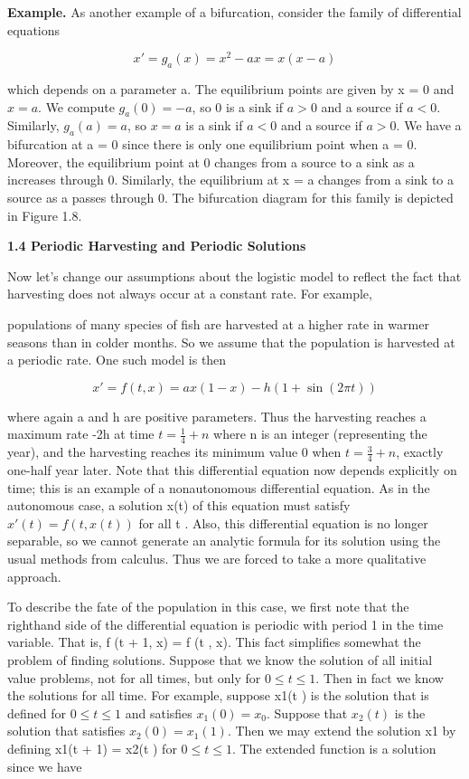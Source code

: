 \documentclass[12pt]{article}
\begin{document}
\hfill

\textbf{Example.} As another example of a bifurcation, consider the family of
differential equations

\[
x' = g_a(x) = x^2 - ax = x(x - a)
\]

which depends on a parameter a. The equilibrium points are given by x = 0
and $x = a$. We compute $g_a(0) = -a$, so 0 is a sink if $a > 0$ and a source if
$a < 0$. Similarly, $g_a(a) = a$, so $x = a$ is a sink if $a < 0$ and a source if $a > 0$.
We have a bifurcation at a = 0 since there is only one equilibrium point when
a = 0. 
Moreover, the equilibrium point at 0 changes from a source to a sink as a increases through 0. 
Similarly, the equilibrium at x = a changes from a sink to a source as a passes through 0.
The bifurcation diagram for this family is depicted in Figure 1.8.

\hfill

\textbf{1.4 Periodic Harvesting and
Periodic Solutions}

\hfill

Now let’s change our assumptions about the logistic model to reflect the
fact that harvesting does not always occur at a constant rate. For example,

populations of many species of fish are harvested at a higher rate in warmer
seasons than in colder months. So we assume that the population is harvested
at a periodic rate. One such model is then

\[
x' = f (t, x) = ax(1 - x) - h(1 + \sin (2 \pi t))
\]


where again a and h are positive parameters. Thus the harvesting reaches a
maximum rate -2h at time $t = \frac{1}{4}+ n$ where n is an integer (representing the
year), and the harvesting reaches its minimum value 0 when $t = \frac{3}{4}+n$, exactly
one-half year later. Note that this differential equation now depends explicitly
on time; this is an example of a nonautonomous differential equation. As in
the autonomous case, a solution x(t) of this equation must satisfy $x'(t) = f (t , x(t ))$ for all t . Also, this differential equation is no longer separable, so we
cannot generate an analytic formula for its solution using the usual methods
from calculus. Thus we are forced to take a more qualitative approach.

To describe the fate of the population in this case, we first note that the righthand
side of the differential equation is periodic with period 1 in the time
variable. That is, f (t + 1, x) = f (t , x). This fact simplifies somewhat the
problem of finding solutions. Suppose that we know the solution of all initial
value problems, not for all times, but only for $0 \leq t \leq 1$. Then in fact we
know the solutions for all time. For example, suppose x1(t ) is the solution that
is defined for $0 \leq t \leq 1$ and satisfies $x_1(0) = x_0$. Suppose that $x_2(t)$ is the
solution that satisfies $x_2(0) = x_1(1)$. Then we may extend the solution x1 by
defining x1(t + 1) = x2(t ) for $0 \leq t \leq 1$. The extended function is a solution
since we have
\end{document}
